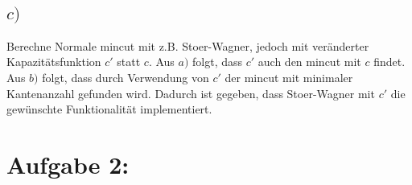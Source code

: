 \documentclass[a4paper]{scrartcl}
\begin{document}
	\subsection*{$c)$}
	Berechne Normale mincut mit z.B. Stoer-Wagner, jedoch mit veränderter Kapazitätsfunktion $c'$ statt $c$. Aus $a)$ folgt, dass $c'$ auch den mincut mit $c$ findet. Aus $b)$ folgt, dass durch Verwendung von $c'$ der mincut mit minimaler Kantenanzahl gefunden wird. Dadurch ist gegeben, dass Stoer-Wagner mit $c'$ die gewünschte Funktionalität implementiert.
	
	\section*{Aufgabe 2:}
	
	
	
	
	
	
	
	
	
	
	
	
	
	
	
	
	
	
	
	
	
	
	
	
	
	
	
	
	
\end{document}

